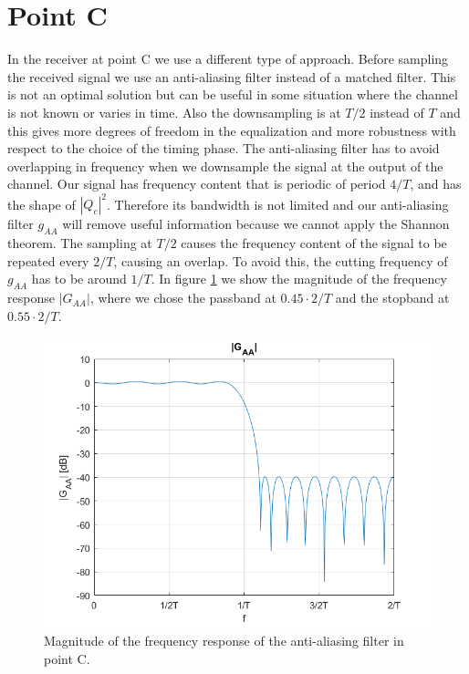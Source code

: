 \documentclass[a4paper,11.5pt]{article}
\begin{document}
\section*{Point C}

In the receiver at point C we use a different type of approach. Before sampling the received signal we use an anti-aliasing filter instead of a matched filter. This is not an optimal solution but can be useful in some situation where the channel is not known or varies in time. Also the downsampling is at $T/2$ instead of $T$ and this gives more degrees of freedom in the equalization and more robustness with respect to the choice of the timing phase. The anti-aliasing filter has to avoid overlapping in frequency when we downsample the signal at the output of the channel. Our signal has frequency content that is periodic of period $4/T$, and has the shape of $|Q_c|^2$. Therefore its bandwidth is not limited and our anti-aliasing filter $g_{AA}$ will remove useful information because we cannot apply the Shannon theorem. The sampling at $T/2$ causes the frequency content of the signal to be repeated every $2/T$, causing an overlap. To avoid this, the cutting frequency of $g_{AA}$ has to be around $1/T$. In figure \ref{fig:C_gaa} we show the magnitude of the frequency response $|G_{AA}|$, where we chose the passband at $0.45 \cdot 2/T$ and the stopband at $0.55\cdot 2/T$.

\begin{figure}[H]
	\begin{center}   
		\includegraphics[width=\textwidth]{figs/GAA.png} 
		\caption{Magnitude of the frequency response of the anti-aliasing filter in point C.}
		\label{fig:C_gaa}
	\end{center}
\end{figure}
\end{document}
